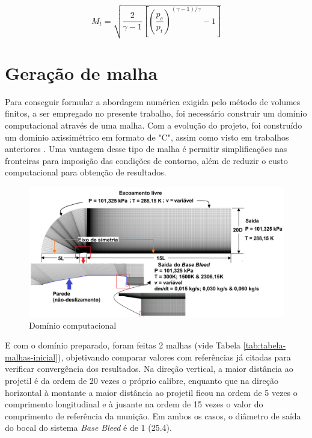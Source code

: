 \medskip

\begin{equation}
    \label{eq:velocidade-mach-BB}
    M_{t} = \sqrt{\frac{2}{\gamma - 1}\left[\left(\frac{p_c}{p_t}\right)^{(\gamma - 1)/\gamma}-1\right]}
\end{equation}

\section{Geração de malha}\label{sec:geracao-malha}

Para conseguir formular a abordagem numérica exigida pelo método de volumes finitos, a ser empregado no presente trabalho, foi necessário construir um domínio computacional através de uma malha. Com a evolução do projeto, foi construído um domínio axissimétrico em formato de "C", assim como visto em trabalhos anteriores \cite{Mahmoud2009,nicolas-perez_accuracy_2017}. Uma vantagem desse tipo de malha é permitir simplificações nas fronteiras para imposição das condições de contorno, além de reduzir o custo computacional para obtenção de resultados.

\begin{figure}[!ht]
	\centering
	\includegraphics[width=1.0\textwidth]{foto01-malha.png}
	\caption{Domínio computacional}
	\label{fig12:autor-malha}
\end{figure}

E com o domínio preparado, foram feitas 2 malhas (vide Tabela \ref{tab:tabela-malhas-inicial}), objetivando comparar valores com referências já citadas \cite{Mahmoud2009} para verificar convergência dos resultados. Na direção vertical, a maior distância ao projetil é da ordem de 20 vezes o próprio calibre, enquanto que na direção horizontal à montante a maior distância ao projetil ficou na ordem de 5 vezes o comprimento longitudinal e à jusante na ordem de 15 vezes o valor do comprimento de referência da munição. Em ambos os casos, o diâmetro de saída do bocal do sistema \textit{Base Bleed} é de \qty{1}{\polegada} (\qty{25,4}{\millimetre}).

